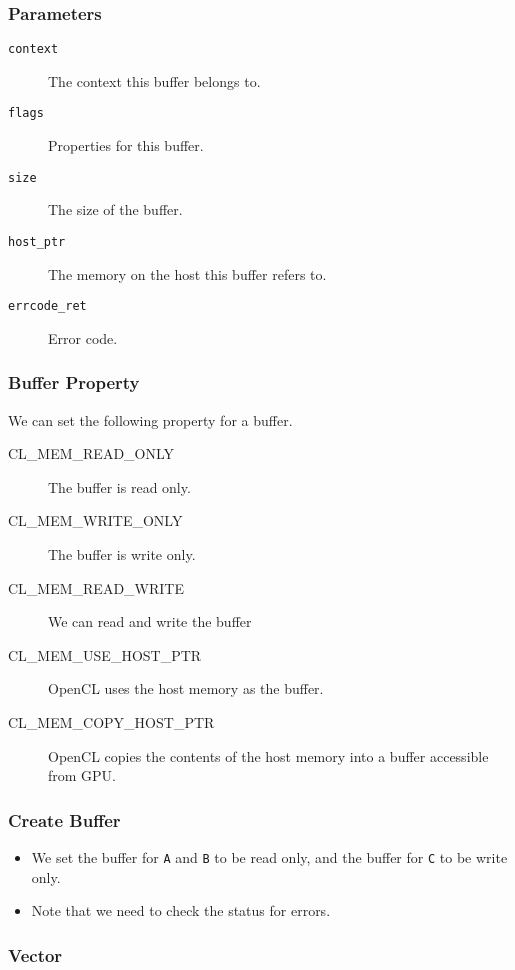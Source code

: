 \documentclass{beamer}
\begin{document}
\begin{frame}
\end{frame}

\begin{frame}
  \frametitle{Parameters}
  \begin{description}
  \item [\tt context] The context this buffer belongs to.
  \item [\tt flags] Properties for this buffer.
  \item [\tt size] The size of the buffer.
  \item [\tt host\_ptr] The memory on the host this buffer refers to.
  \item [\tt errcode\_ret] Error code.
  \end{description}
\end{frame}

\begin{frame}
  \frametitle{Buffer Property}
  We can set the following property for a buffer.
  \begin{description}
  \item[CL\_MEM\_READ\_ONLY] The buffer is read only.
  \item[CL\_MEM\_WRITE\_ONLY] The buffer is write only.
  \item[CL\_MEM\_READ\_WRITE] We can read and write the buffer
  \item[CL\_MEM\_USE\_HOST\_PTR] OpenCL uses the host memory as the buffer.
  \item[CL\_MEM\_COPY\_HOST\_PTR] OpenCL copies the contents of the
    host memory into a buffer accessible from GPU.
  \end{description}
\end{frame}

\begin{frame}
  \frametitle{Create Buffer}
  \begin{itemize}
  \item We set the buffer for {\tt A} and {\tt B} to be read only,
    and the buffer for {\tt C} to be write only.
  \item Note that we need to check the status for errors.
  \end{itemize}
\end{frame}

\begin{frame}
  \frametitle{Vector}
\end{frame}
\end{document}
